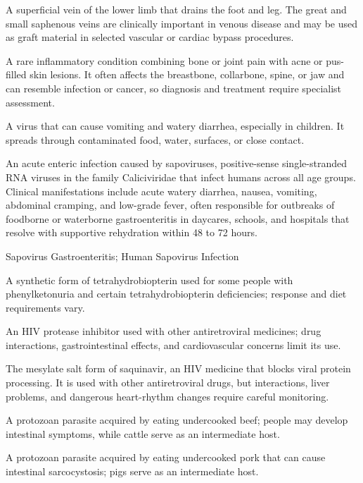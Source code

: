  A superficial vein of the lower limb that drains the foot and leg. The great and small saphenous
veins are clinically important in venous disease and may be used as graft material in selected
vascular or cardiac bypass procedures.

 A rare inflammatory condition combining bone or joint pain with acne or pus-filled skin lesions. It often affects the breastbone, collarbone, spine, or jaw and can resemble infection or cancer, so diagnosis and treatment require specialist assessment.

 A virus that can cause vomiting and watery diarrhea, especially in children. It spreads through contaminated food, water, surfaces, or close contact.

 An acute enteric infection caused by sapoviruses, positive-sense single-stranded RNA viruses in the family Caliciviridae that infect humans across all age groups. Clinical manifestations include acute watery diarrhea, nausea, vomiting, abdominal cramping, and low-grade fever, often responsible for outbreaks of foodborne or waterborne gastroenteritis in daycares, schools, and hospitals that resolve with supportive rehydration within 48 to 72 hours.

\synonyms
Sapovirus Gastroenteritis; Human Sapovirus Infection

 A synthetic form of tetrahydrobiopterin used for some people with phenylketonuria and certain tetrahydrobiopterin deficiencies; response and diet requirements vary.

 An HIV protease inhibitor used with other antiretroviral medicines; drug interactions, gastrointestinal effects, and cardiovascular concerns limit its use.

 The mesylate salt form of saquinavir, an HIV medicine that blocks viral protein processing. It is used with other antiretroviral drugs, but interactions, liver problems, and dangerous heart-rhythm changes require careful monitoring.

 A protozoan parasite acquired by eating undercooked beef; people may develop intestinal symptoms, while cattle serve as an intermediate host.

 A protozoan parasite acquired by eating undercooked pork that can cause intestinal sarcocystosis; pigs serve as an intermediate host.


